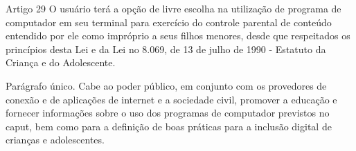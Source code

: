 \begin{frame}{Artigo 29}
O usuário terá a opção de livre escolha na utilização de programa de computador em seu terminal para exercício do controle parental de conteúdo entendido por ele como impróprio a seus filhos menores, desde que respeitados os princípios desta Lei e da Lei no 8.069, de 13 de julho de 1990 - Estatuto da Criança e do Adolescente.

Parágrafo único. Cabe ao poder público, em conjunto com os provedores de conexão e de aplicações de internet e a sociedade civil, promover a educação e fornecer informações sobre o uso dos programas de computador previstos no caput, bem como para a definição de boas práticas para a inclusão digital de crianças e adolescentes.
\end{frame}